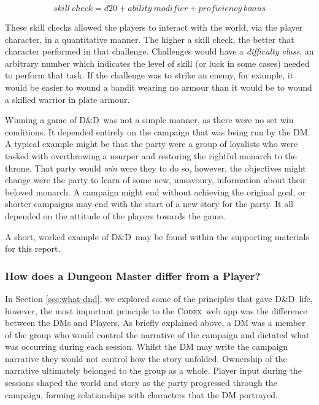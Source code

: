 \documentclass[final]{cmpreport}
\newcommand{\dnd}{D\&D}
\newcommand{\Codex}{\textsc{Codex}}
\begin{document}
			\begin{equation} \label{eq:skill-check}
			skill \ check = d20 + ability \ modifier + proficiency \ bonus
			\end{equation}
			
			These skill checks allowed the players to interact with the world, via the player character, in a quantitative manner. The higher a skill check, the better that character performed in that challenge. Challenges would have a \emph{difficulty class}, an arbitrary number which indicates the level of skill (or luck in some cases) needed to perform that task. If the challenge was to strike an enemy, for example, it would be easier to wound a bandit wearing no armour than it would be to wound a skilled warrior in plate armour. 
			
			Winning a game of \dnd \ was not a simple manner, as there were no set win conditions. It depended entirely on the campaign that was being run by the DM. A typical example might be that the party were a group of loyalists who were tasked with overthrowing a usurper and restoring the rightful monarch to the throne. That party would \emph{win} were they to do so, however, the objectives might change were the party to learn of some new, unsavoury, information about their beloved monarch. A campaign might end without achieving the original goal, or shorter campaigns may end with the start of a new story for the party. It all depended on the attitude of the players towards the game.
			
			A short, worked example of \dnd \ may be found within the supporting materials for this report.
			
			\subsubsection{How does a Dungeon Master differ from a Player?} \label{sec:dm-vs-player}
			In Section \ref{sec:what-dnd}, we explored some of the principles that gave \dnd \ life, however, the most important principle to the \Codex \ web app was the difference between the DMs and Players. As briefly explained above, a DM was a member of the group who would control the narrative of the campaign and dictated what was occurring during each session. Whilst the DM may write the campaign narrative they would not control how the story unfolded. Ownership of the narrative ultimately belonged to the group as a whole. Player input during the sessions shaped the world and story as the party progressed through the campaign, forming relationships with characters that the DM portrayed. 
			
\end{document}
